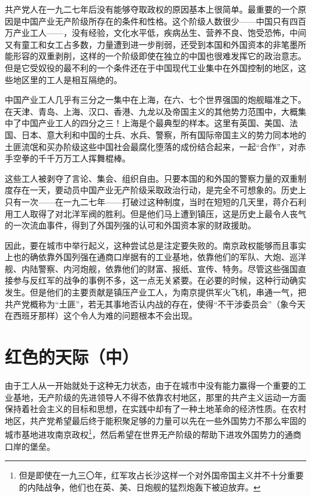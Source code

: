 \documentclass[10pt]{book}
\begin{document}
共产党人在一九二七年后没有能够夺取政权的原因基本上很简单。最重要的一个原因是中国产业无产阶级所存在的条件和性格。这个阶级人数很少——中国只有四百万产业工人——，没有经验，文化水平低，疾病丛生、营养不良、饱受恐怖，中间又有童工和女工占多数，力量遭到进一步削弱，还受到本国和外国资本的非笔墨所能形容的双重剥削，这样的一个阶级即使在独立的中国也很难发挥它的政治意志。但是它受奴役的最不利的一个条件还在于中国现代工业集中在外国控制的地区，这些地区里的工人是相互隔绝的。

中国产业工人几乎有三分之一集中在上海，在六、七个世界强国的炮舰瞄准之下。在天津、青岛、上海、汉口、香港、九龙以及帝国主义的其他势力范围中，大概集中了中国产业工人的四分之三！上海是个最典型的样本。这里有英国、美国、法国、日本、意大利和中国的士兵、水兵、警察，所有国际帝国主义的势力同本地的土匪流氓和买办阶级这些中国社会最腐化堕落的成份结合起来，一起“合作”，对赤手空拳的千千万万工人挥舞棍棒。

这些工人被剥夺了言论、集会、组织自由。只要本国的和外国的警察力量的双重制度存在一天，要动员中国产业无产阶级采取政治行动，是完全不可想象的。历史上只有一次——在一九二七年——打破过这种制度，当时在短短的几天里，蒋介石利用工人取得了对北洋军阀的胜利。但是他们马上遭到镇压，这是历史上最令人丧气的一次流血事件，得到了外国列强的认可和外国资本家的财政援助。

因此，要在城市中举行起义，这种尝试总是注定要失败的。南京政权能够而且事实上也的确依靠外国列强在通商口岸据有的工业基地，依靠他们的军队、大炮、巡洋舰、内陆警察、内河炮舰，依靠他们的财富、报纸、宣传、特务。尽管这些强国直接参与反红军的战争的事例不多，这一点无关紧要。在必要的时候，这种行动确实发生。但是他们的主要贡献是镇压产业工人，为南京提供军火飞机，串通一气，把共产党概称为“土匪”，若无其事地否认内战的存在，使得“不干涉委员会”（象今天在西班牙那样）这个令人为难的问题根本不会出现。



\section{红色的天际（中）}

由于工人从一开始就处于这种无力状态，由于在城市中没有能力赢得一个重要的工业基地，无产阶级的先进领导人不得不依靠农村地区，那里的共产主义运动一方面保持着社会主义的目标和思想，在实践中却有了一种土地革命的经济性质。在农村地区，共产党希望最后终于能积聚足够的力量可以先在一些外国势力不那么牢固的城市基地进攻南京政权\footnote{但是即使在一九三〇年，红军攻占长沙这样一个对外国帝国主义并不十分重要的内陆战争，他们也在英、美、日炮舰的猛烈炮轰下被迫放弃。}，然后希望在世界无产阶级的帮助下进攻外国势力的通商口岸的堡垒。
\end{document}
